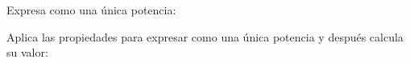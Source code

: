 \documentclass[spanish, 11pt]{exam}
\begin{document}
\begin{questions}

\question[1\half] Expresa como una única potencia:
\begin{multicols}{3}
\end{multicols}



\question[2] Aplica las propiedades para expresar como una única potencia y después calcula su valor:
\begin{multicols}{2}
\end{multicols}
\end{questions}
\end{document}
